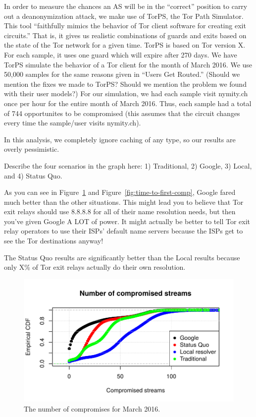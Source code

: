 In order to measure the chances an AS will be in the ``correct'' position to carry out a
deanonymization attack, we make use of TorPS, the Tor Path Simulator. This tool 
``faithfully mimics the behavior of Tor client software for creating exit circuits.''
That is, it gives us realistic combinations of guards and exits based on the state of the 
Tor network for a given time. TorPS is based on Tor version X. For each sample, it uses 
one guard which will expire after 270 days. We have TorPS simulate the behavior of a Tor 
client for the month of March 2016. We use 50,000 samples for the same reasons given in
``Users Get Routed.'' (Should we mention the fixes we made to TorPS? Should we mention 
the problem we found with their user models?) For our simulation, we had each sample 
visit nymity.ch once per hour for the entire month of March 2016. Thus, each sample had 
a total of 744 opportunites to be compromised (this assumes that the circuit changes 
every time the sample/user visits nymity.ch).

In this analysis, we completely ignore caching of any type, so our results are overly 
pessimistic.

Describe the four scenarios in the graph here: 1) Traditional, 2) Google, 3) Local, and 
4) Status Quo.

As you can see in Figure~\ref{fig:num-compromises} and Figure~\ref{fig:time-to-first-comp}, 
Google fared much better than the other situations. This might lead you to believe that 
Tor exit relays should use 8.8.8.8 for all of their name resolution needs, but then you've 
given Google A LOT of power. It might actually be better to tell Tor exit relay operators 
to use their ISPs' default name servers because the ISPs get to see the Tor destinations 
anyway!

The Status Quo results are significantly better than the Local results because only X\% 
of Tor exit relays actually do their own resolution.

\begin{figure}[t]
	\centering
	\includegraphics[width=0.75\linewidth]{figures/num-compromised-streams.pdf}
	\caption{The number of compromises for March 2016.}
	\label{fig:num-compromises}
\end{figure}

